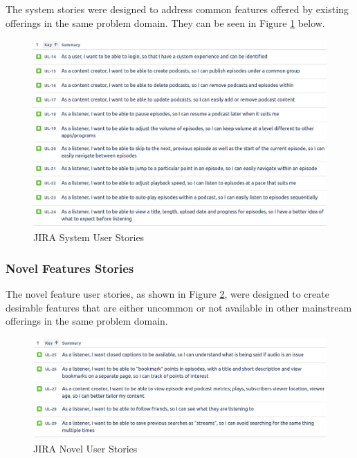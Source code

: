 \documentclass[12pt]{article}
\begin{document}
The system stories were designed to address common features offered by existing offerings in the same problem domain.
They can be seen in Figure \ref{fig:jira_system_user_stories} below.

\begin{figure}[ht]
    \centering
    \includegraphics[width=\textwidth]{resources/system_stories}
    \caption{JIRA System User Stories}
    \label{fig:jira_system_user_stories}
\end{figure}

\newpage
\subsubsection{Novel Features Stories} \label{sec:novel_features_stories}

The novel feature user stories, as shown in Figure \ref{fig:jira_novel_user_stories}, were designed to create desirable features that are either uncommon or not
available in other mainstream offerings in the same problem domain.

\begin{figure}[h]
    \centering
    \includegraphics[width=\textwidth]{resources/novel_stories}
    \caption{JIRA Novel User Stories}
    \label{fig:jira_novel_user_stories}
\end{figure}
\end{document}
